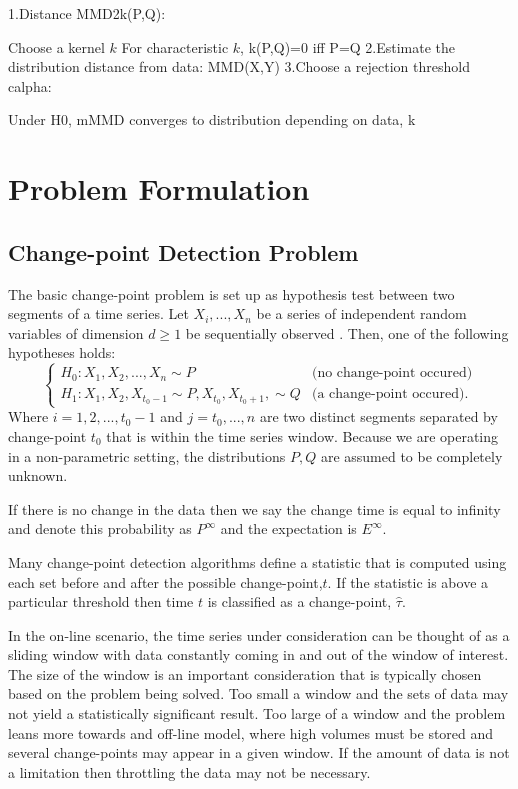 1.Distance MMD2k(P,Q):

Choose a kernel $k$
For characteristic $k$, k(P,Q)=0 iff P=Q
2.Estimate the distribution distance from data: MMD(X,Y)
3.Choose a rejection threshold calpha:

Under H0, mMMD converges to distribution depending on data, k


\section{Problem Formulation}

\subsection{Change-point Detection Problem}
The basic change-point problem is set up as hypothesis test between two segments of a time series. Let $X_i,...,X_n$ be a series of independent random variables of dimension $d \geq 1$ be sequentially observed . Then, one of the following hypotheses holds:
\begin{equation}
  \begin{cases}
    H_0: X_1, X_2, ...,X_n \sim  P & \text{(no change-point occured)} \\
    H_1: X_1,X_2, X_{t_0-1} \sim P, X_{t_0}, X_{t_0+1},  \sim Q & \text{(a change-point occured)}. 
  \end{cases}
\end{equation}
Where $i=1,2,...,t_0-1$ and $j=t_0,...,n$  are two distinct segments separated by change-point $t_0$ that is within the time series window.  Because we are operating in a non-parametric setting, the distributions $P, Q$ are assumed to be completely unknown. 

If there is no change in the data then we say the change time is equal to infinity and denote this probability as $P^{\infty}$ and the expectation is $E^{\infty}$.

Many change-point detection algorithms define a statistic that is computed using each set before and after the possible change-point,$t$. If the statistic is above a particular threshold then time $t$ is classified as a change-point, $\hat{\tau}$.

In the on-line scenario, the time series under consideration can be thought of as a sliding window with data constantly coming in and out of the window of interest. The size of the window is an important consideration that is typically chosen based on the problem being solved. Too small a window and the sets of data may not yield a statistically significant result. Too large of a window and the problem leans more towards and off-line model, where high volumes must be stored and several change-points may appear in a given window. If the amount of data is not a limitation then throttling the data may not be necessary.

